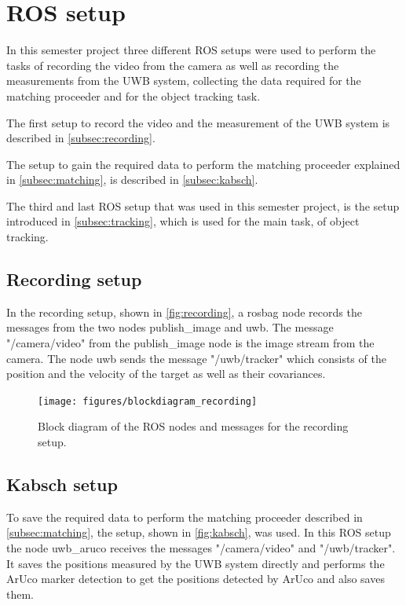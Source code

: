 \section{\ac{ROS} setup}
In this semester project three different \ac{ROS} setups were used to perform the tasks of recording the video from the camera as well as recording the measurements from the \ac{UWB} system, collecting the data required for the matching proceeder and for the object tracking task.

The first setup to record the video and the measurement of the \ac{UWB} system is described in \autoref{subsec:recording}.

The setup to gain the required data to perform the matching proceeder explained in \autoref{subsec:matching}, is described in \autoref{subsec:kabsch}.

The third and last \ac{ROS} setup that was used in this semester project, is the setup introduced in \autoref{subsec:tracking}, which is used for the main task, of object tracking.

\subsection{Recording setup}\label{subsec:recording}
In the recording setup, shown in \autoref{fig:recording}, a rosbag node records the messages from the two nodes publish\_image and uwb. The message "/camera/video" from the publish\_image node is the image stream from the camera. The node uwb sends the message "/uwb/tracker" which consists of the position and the velocity of the target as well as their covariances.

\begin{figure}[ht!]\centering
	\texttt{[image: figures/blockdiagram\_recording]}
	\caption{Block diagram of the \ac{ROS} nodes and messages for the recording setup.}\label{fig:recording}
\end{figure}

\subsection{Kabsch setup}\label{subsec:kabsch}
To save the required data to perform the matching proceeder described in \autoref{subsec:matching}, the setup, shown in \autoref{fig:kabsch}, was used. In this \ac{ROS} setup the node uwb\_aruco receives the messages "/camera/video" and "/uwb/tracker". It saves the positions measured by the \ac{UWB} system directly and performs the ArUco marker detection to get the positions detected by ArUco and also saves them.

